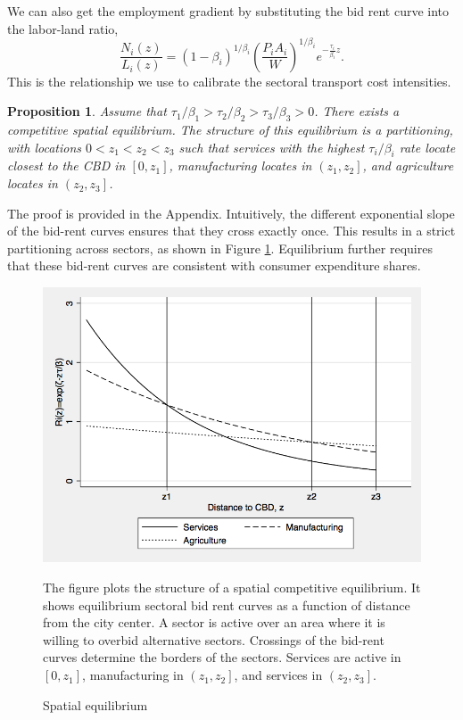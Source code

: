 \documentclass[12pt]{article}
\newtheorem{proposition}{Proposition}
\begin{document}
We can also get the employment gradient by substituting the bid rent curve into the labor-land ratio,
\begin{equation}
\label{eq:EmpGrad}
\frac{N_i(z)}{L_i(z)} = (1-\beta_i)^{1/\beta_i} \left(\frac{P_iA_i}{W}\right)^{1/\beta_i} e^{-\frac{\tau_i}{\beta_i} z}.
\end{equation}
This is the relationship we use to calibrate the sectoral transport cost intensities.

\begin{proposition}\label{prop:existence}
Assume that $\tau_1/\beta_1>\tau_2/\beta_2>\tau_3/\beta_3>0$. There exists a competitive spatial equilibrium. The structure of this equilibrium is a partitioning, with locations $0<z_1<z_2<z_3$ such that services with the highest $\tau_i/\beta_i$ rate locate closest to the CBD in $\left[0,z_1\right]$, manufacturing locates in $\left(z_1,z_2\right]$, and agriculture locates in $\left(z_2,z_3\right]$.
\end{proposition}
The proof is provided in the Appendix. Intuitively, the different exponential slope of the bid-rent curves ensures that they cross exactly once. This results in a strict partitioning across sectors, as shown in Figure \ref{fig:BidRent}. Equilibrium further requires that these bid-rent curves are consistent with consumer expenditure shares.

\begin{figure}[h!]
\caption{Spatial equilibrium\label{fig:BidRent}}
\begin{center}
\includegraphics[scale=0.4]{figures/bid_rent_curves}
\end{center}

\noindent \footnotesize{The figure plots the structure of a spatial competitive equilibrium. It shows equilibrium sectoral bid rent curves as a function of distance from the city center. A sector is active over an area where it is willing to overbid alternative sectors. Crossings of the bid-rent curves determine the borders of the sectors. Services are active in $[0,z_1]$, manufacturing in $\left(z_1,z_2\right]$, and services in $\left(z_2,z_3\right]$.}
\end{figure}
\end{document}
